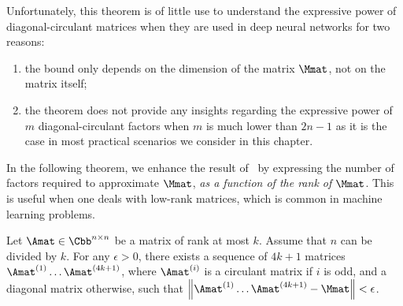 



Unfortunately, this theorem is of little use to understand the expressive power of diagonal-circulant matrices when they are used in deep neural networks for two reasons:
\begin{enumerate}%
  \item the bound only depends on the dimension of the matrix $\Mmat$, not on the matrix itself;
  \item the theorem does not provide any insights regarding the expressive power of $m$ diagonal-circulant factors when $m$ is much lower than $2n - 1$ as it is the case in most practical scenarios we consider in this chapter. 
\end{enumerate}

In the following theorem, we enhance the result of~\citet{huhtanen2015factoring} by expressing the number of factors required to approximate $\Mmat$, \emph{as a function of the rank of $\Mmat$}.
This is useful when one deals with low-rank matrices, which is common in machine learning problems. 
\begin{maintheorem} \label{theorem:ch4-rank-decomposition}
  Let $\Amat \in \Cnn$ be a matrix of rank at most $k$.
  Assume that $n$ can be divided by $k$.
  For any $\epsilon > 0$, there exists a sequence of $4k+1$ matrices $\Amat^{(1)} \ldots \Amat^{(4k+1)}$, where $\Amat^{(i)}$ is a circulant matrix if $i$ is odd, and a diagonal matrix otherwise, such that $\norm{\Amat^{(1)} \ldots \Amat^{(4k+1)} - \Mmat} < \epsilon$.
\end{maintheorem}

